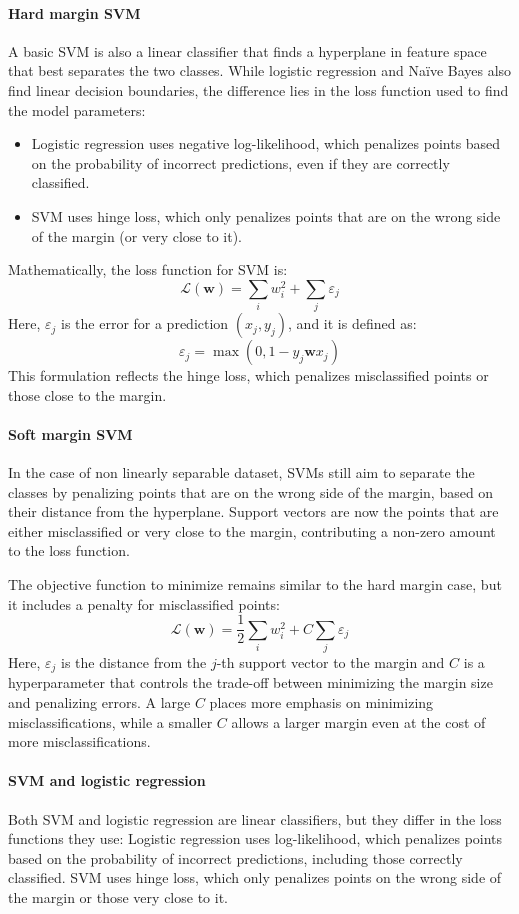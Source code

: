 \paragraph*{Hard margin SVM}
A basic SVM is also a linear classifier that finds a hyperplane in feature space that best separates the two classes. 
While logistic regression and Naïve Bayes also find linear decision boundaries, the difference lies in the loss function used to find the model parameters:
\begin{itemize}
    \item Logistic regression uses negative log-likelihood, which penalizes points based on the probability of incorrect predictions, even if they are correctly classified.
    \item SVM uses hinge loss, which only penalizes points that are on the wrong side of the margin (or very close to it).
\end{itemize}
\noindent Mathematically, the loss function for SVM is:
\[\mathcal{L}(\mathbf{w})=\sum_iw_i^2+\sum_j\varepsilon_j\]
\noindent Here, $\varepsilon_j$ is the error for a prediction $(x_j,y_j)$, and it is defined as:
\[\varepsilon_j =\max(0,1-y_j\mathbf{w}x_j)\] 
\noindent This formulation reflects the hinge loss, which penalizes misclassified points or those close to the margin.

\paragraph*{Soft margin SVM}
In the case of non linearly separable dataset, SVMs still aim to separate the classes by penalizing points that are on the wrong side of the margin, based on their distance from the hyperplane.
Support vectors are now the points that are either misclassified or very close to the margin, contributing a non-zero amount to the loss function.

\noindent The objective function to minimize remains similar to the hard margin case, but it includes a penalty for misclassified points:
\[\mathcal{L}(\mathbf{w})=\dfrac{1}{2}\sum_iw_i^2+C\sum_j\varepsilon_j\]
Here, $\varepsilon_j$ is the distance from the $j$-th support vector to the margin and $C$ is a hyperparameter that controls the trade-off between minimizing the margin size and penalizing errors.
A large $C$ places more emphasis on minimizing misclassifications, while a smaller $C$ allows a larger margin even at the cost of more misclassifications.

\paragraph*{SVM and logistic regression}
Both SVM and logistic regression are linear classifiers, but they differ in the loss functions they use:
Logistic regression uses log-likelihood, which penalizes points based on the probability of incorrect predictions, including those correctly classified.
SVM uses hinge loss, which only penalizes points on the wrong side of the margin or those very close to it.